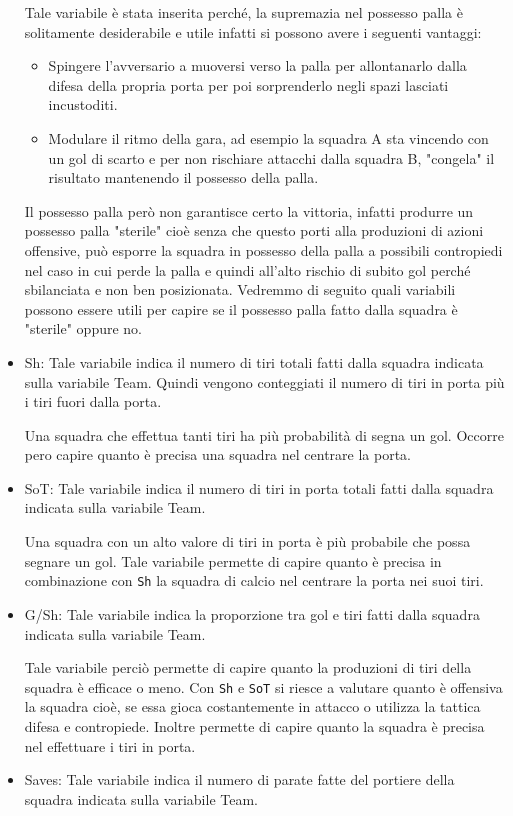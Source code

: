 \begin{itemize}
	Tale variabile è stata inserita perché, la supremazia nel possesso palla è solitamente desiderabile e utile infatti si possono avere i seguenti vantaggi:
	\begin{itemize}
		\item Spingere l’avversario a muoversi verso la palla per allontanarlo dalla difesa della propria porta per poi sorprenderlo negli spazi lasciati incustoditi.   
		\item Modulare il ritmo della gara, ad esempio la squadra A sta vincendo con un gol di scarto e per non rischiare attacchi dalla squadra B, "congela" il risultato mantenendo il possesso della palla.
	\end{itemize}
	Il possesso palla però non garantisce certo la vittoria, infatti produrre un possesso palla "sterile" cioè senza che questo porti alla produzioni di azioni offensive, può esporre la squadra in possesso della palla a possibili contropiedi nel caso in cui perde la palla e quindi all'alto rischio di subito gol perché sbilanciata e non ben posizionata. Vedremmo di seguito quali variabili possono essere utili per capire se il possesso palla fatto dalla squadra è "sterile" oppure no.

	\item \textsf{Sh}: Tale variabile indica il numero di tiri totali fatti dalla squadra indicata sulla variabile \textsf{Team}. Quindi vengono conteggiati il numero di tiri in porta più i tiri fuori dalla porta. 
	
	Una squadra che effettua tanti tiri ha più probabilità di segna un gol. Occorre pero capire quanto è precisa una squadra nel centrare la porta.
	\item \textsf{SoT}: Tale variabile indica il numero di tiri in porta totali fatti dalla squadra indicata sulla variabile \textsf{Team}. 
	
	Una squadra con un alto valore di tiri in porta è più probabile che possa segnare un gol. Tale variabile permette di capire quanto è precisa in combinazione con \texttt{Sh} la squadra di calcio nel centrare la porta nei suoi tiri.
	\item \textsf{G/Sh}: Tale variabile indica la proporzione tra gol e tiri fatti dalla squadra indicata sulla variabile \textsf{Team}. 
	
	Tale variabile perciò permette di capire quanto la produzioni di tiri della squadra è efficace o meno. Con \texttt{Sh} e \texttt{SoT} si riesce a valutare quanto è offensiva la squadra cioè, se essa gioca costantemente in attacco o utilizza la tattica difesa e contropiede. Inoltre permette di capire quanto la squadra è precisa nel effettuare i tiri in porta.
	\item \textsf{Saves}: Tale variabile indica il numero di parate fatte del portiere della squadra indicata sulla variabile \textsf{Team}. 
	

\end{itemize}
